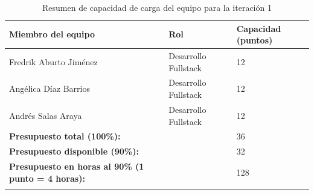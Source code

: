 \begin{longtable}{|l|l|l|}
    \hline
    \textbf{Miembro del equipo} & \textbf{Rol} & \textbf{Capacidad (puntos)} \\
    \hline
    Fredrik Aburto Jiménez & Desarrollo Fullstack & 12 \\
    Angélica Díaz Barrios & Desarrollo Fullstack & 12 \\
    Andrés Salas Araya & Desarrollo Fullstack & 12 \\
    \hline\hline
    \textbf{Presupuesto total (100\%):} & & 36\\
    \textbf{Presupuesto disponible (90\%):} & & 32\\
    \textbf{Presupuesto en horas al 90\% (1 punto = 4 horas):} &  & 128\\
    \hline
    \caption{Resumen de capacidad de carga del equipo para la iteración 1}
\end{longtable}

